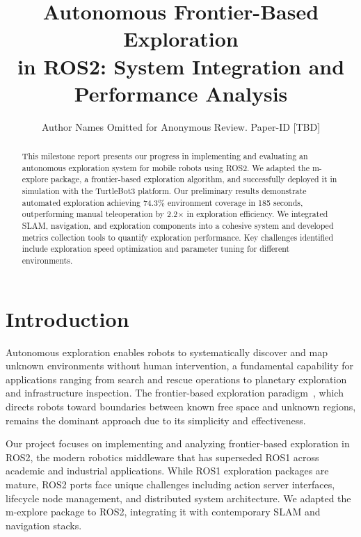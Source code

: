 \documentclass[conference]{IEEEtran}
\begin{document}
\title{Autonomous Frontier-Based Exploration\\ in ROS2: System Integration and Performance Analysis}

\author{Author Names Omitted for Anonymous Review. Paper-ID [TBD]}

\maketitle

\begin{abstract}
This milestone report presents our progress in implementing and evaluating an autonomous exploration system for mobile robots using ROS2. We adapted the m-explore package, a frontier-based exploration algorithm, and successfully deployed it in simulation with the TurtleBot3 platform. Our preliminary results demonstrate automated exploration achieving 74.3\% environment coverage in 185 seconds, outperforming manual teleoperation by 2.2$\times$ in exploration efficiency. We integrated SLAM, navigation, and exploration components into a cohesive system and developed metrics collection tools to quantify exploration performance. Key challenges identified include exploration speed optimization and parameter tuning for different environments.
\end{abstract}

\IEEEpeerreviewmaketitle

\section{Introduction}

Autonomous exploration enables robots to systematically discover and map unknown environments without human intervention, a fundamental capability for applications ranging from search and rescue operations to planetary exploration and infrastructure inspection. The frontier-based exploration paradigm~\cite{yamauchi1997frontier}, which directs robots toward boundaries between known free space and unknown regions, remains the dominant approach due to its simplicity and effectiveness.

Our project focuses on implementing and analyzing frontier-based exploration in ROS2, the modern robotics middleware that has superseded ROS1 across academic and industrial applications. While ROS1 exploration packages are mature, ROS2 ports face unique challenges including action server interfaces, lifecycle node management, and distributed system architecture. We adapted the m-explore package to ROS2, integrating it with contemporary SLAM and navigation stacks.
\end{document}
